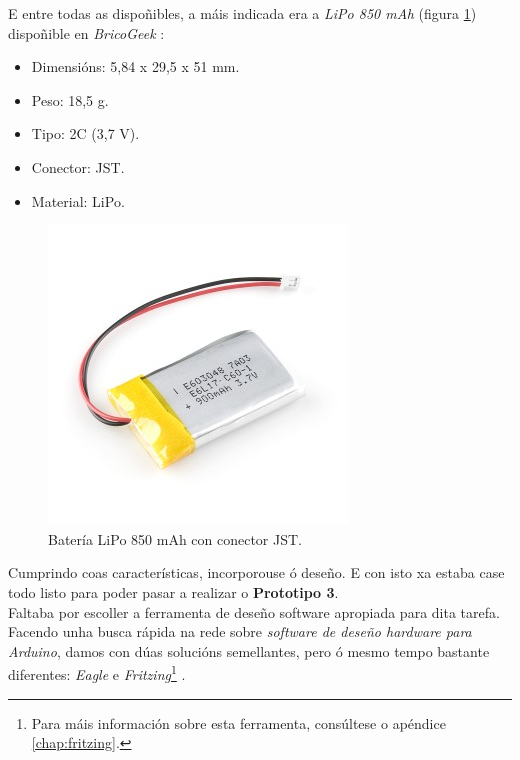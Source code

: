   E entre todas as dispoñibles, a máis indicada era a \textit{LiPo 850 mAh}
  (figura \ref{figura:LiPo}) dispoñible en \textit{BricoGeek} \cite{LiPo}:

  \begin{itemize}
   \item Dimensións: 5,84 x 29,5 x 51 mm.
   \item Peso: 18,5 g.
   \item Tipo: 2C (3,7 V).
   \item Conector: JST.
   \item Material: LiPo.
  \end{itemize}

  \begin{figure}[htbp]
   \centering
   \includegraphics[scale=0.6,keepaspectratio=true]{./imagenes/lipo.jpg}
   \caption{Batería LiPo 850 mAh con conector JST.}
   \label{figura:LiPo}
  \end{figure}

  Cumprindo coas características, incorporouse ó deseño. E con isto xa estaba
  case todo listo para poder pasar a realizar o \textbf{Prototipo 3}. \\

  Faltaba por escoller a ferramenta de deseño software apropiada para dita
  tarefa. Facendo unha busca rápida na rede sobre
  \textit{software de deseño hardware para Arduino}, damos con dúas solucións
  semellantes, pero ó mesmo tempo bastante diferentes: \textit{Eagle}
  \cite{Eagle} e \textit{Fritzing}\footnote{Para máis información sobre esta
  ferramenta, consúltese o apéndice \ref{chap:fritzing}.} \cite{Fritzing}.


